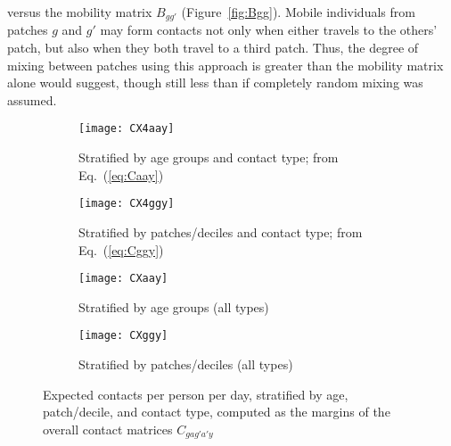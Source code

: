 versus the mobility matrix $B_{gg'}$ (Figure~\ref{fig:Bgg}).
Mobile individuals from patches $g$ and $g'$ may form contacts
not only when either travels to the others' patch,
but also when they both travel to a third patch.
Thus, the degree of mixing between patches using this approach
is greater than the mobility matrix alone would suggest,
though still less than if completely random mixing was assumed.
\begin{figure}
  \begin{subfigure}{\linewidth}
    \texttt{[image: CX4aay]}
    \caption{Stratified by age groups and contact type; from Eq.~(\ref{eq:Caay})}
    \label{fig:CX4aay}
  \end{subfigure}
  \begin{subfigure}{\linewidth}
    \texttt{[image: CX4ggy]}
    \caption{Stratified by patches/deciles and contact type; from Eq.~(\ref{eq:Cggy})}
    \label{fig:CX4ggy}
  \end{subfigure}
  \begin{subfigure}{0.48\linewidth}
    \centering
    \texttt{[image: CXaay]}
    \caption{Stratified by age groups (all types)}
    \label{fig:CXaay}
  \end{subfigure}\hfill%
  \begin{subfigure}{0.48\linewidth}
    \centering
    \texttt{[image: CXggy]}
    \caption{Stratified by patches/deciles (all types)}
    \label{fig:CXggy}
  \end{subfigure}
  \caption{Expected contacts per person per day, stratified by age, patch/decile, and contact type,
    computed as the margins of the overall contact matrices $C_{gag'a'y}$}
  \label{fig:CX4y}
\end{figure}